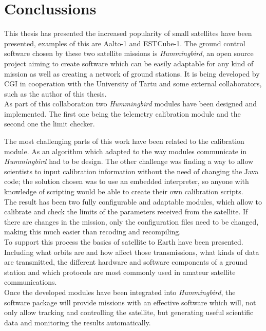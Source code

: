\chapter{Conclussions}

This thesis has presented the increased popularity of small satellites have been presented, examples of this are Aalto-1 and ESTCube-1. The ground control software chosen by these two satellite missions is \emph{Hummingbird}, an open source project aiming to create software which can be easily adaptable for any kind of mission as well as creating a network of ground stations. It is being developed by CGI in cooperation with the University of Tartu and some external collaborators, such as the author of this thesis.\\ 


As part of this collaboration two \emph{Hummingbird} modules have been designed and implemented. The first one being the telemetry calibration module and the second one the limit checker. 

The most challenging parts of this work have been related to the calibration module. As an algorithm which adapted to the way modules communicate in \emph{Hummingbird} had to be design. The other challenge was finding a way to allow scientists to input calibration information without the need of changing the Java code; the solution chosen was to use an embedded  interpreter, so anyone with knowledge of scripting would be able to create their own calibration scripts.\\

The result has been two fully configurable and adaptable modules, which allow to calibrate and check the limits of the parameters received from the satellite. If there are changes in the mission, only the configuration files need to be changed, making this much easier than recoding and recompiling.\\

To support this process the basics of satellite to Earth have been presented. Including what orbits are and how affect those transmissions, what kinds of data are transmitted, the different hardware and software components of a ground station and which protocols are most commonly used in amateur satellite communications.\\

\pagebreak
Once the developed modules have been integrated into \emph{Hummingbird}, the software package will provide missions with an effective software which will, not only allow tracking and controlling the satellite, but generating useful scientific data and monitoring the results automatically.\\


\newpage